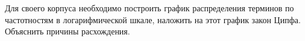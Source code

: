 
Для своего корпуса необходимо построить график распределения терминов по частотностям в логарифмической шкале, наложить на этот график закон Ципфа. Объяснить причины расхождения.

\pagebreak
